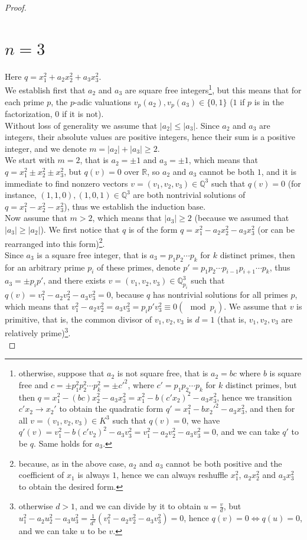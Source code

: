 \documentclass{article}
\begin{document}
\begin{proof}
\section*{$n=3$}
Here $q=x_1^2+a_2x_2^2+a_3x_3^2$.\\
We establish first that $a_2$ and $a_3$ are square free integers\footnote{otherwise, suppose that $a_2$ is not square free, that is $a_2=bc$ where $b$ is square free and $c=\pm{p}_1^2p_2^2\cdots{p}_k^2=\pm{c}'^2$, where $c'={p}_1p_2\cdots{p}_k$ for $k$ distinct primes, but then $q=x_1^2-(bc)x_2^2-a_3x_3^2=x_1^2-b(c'x_2)^2-a_3x_3^2$, hence we transition $c'x_2\rightarrow{x}_2'$ to obtain the quadratic form $q'=x_1^2-bx_2'^2-a_3x_3^2$, and then for all $v=(v_1,v_2,v_3)\in{K}^3$ such that $q(v)=0$, we have $q'(v)=v_1^2-b(c'v_2)^2-a_3v_3^2=v_1^2-a_2v_2^2-a_3v_3^2=0$, and we can take $q'$ to be $q$. Same holds for $a_3$.}, but this means that for each prime $p$, the $p$-adic valuations $v_p(a_2),v_p(a_3)\in\{0,1\}$ ($1$ if $p$ is in the factorization, $0$ if it is not).\\
Without loss of generality we assume that $|a_2|\leq|a_3|$. Since $a_2$ and $a_3$ are integers, their absolute values are positive integers, hence their sum is a positive integer, and we denote $m=|a_2|+|a_3|\geq2$.\\
We start with $m=2$, that is $a_2=\pm1$ and $a_3=\pm1$, which means that \\$q=x_1^2\pm{x}_2^2\pm{x}_3^2$, but $q(v)=0$ over $\mathbb{R}$, so $a_2$ and $a_3$ cannot be both $1$, and it is immediate to find nonzero vectors $v=(v_1,v_2,v_3)\in\mathbb{Q}^3$ such that $q(v)=0$ (for instance, $(1,1,0),(1,0,1)\in\mathbb{Q}^3$ are both nontrivial solutions of $q=x_1^2-x_2^2-x_3^2$), thus we establish the induction base.\\
\newline
Now assume that $m>2$, which means that $|a_3|\geq{2}$ (because we assumed that $|a_3|\geq|a_2|$). We first notice that $q$ is of the form $q=x_1^2-a_2x_2^2-a_3x_3^2$ (or can be rearranged into this form)\footnote{because, as in the above case, $a_2$ and $a_3$ cannot be both positive and the coefficient of $x_1$ is always $1$, hence we can always reshuffle $x_1^2$, $a_2x_2^2$ and $a_3x_3^2$ to obtain the desired form.}.\\ 
Since $a_3$ is a square free integer, that is $a_3=p_1p_2\cdots{p}_k$ for $k$ distinct primes, then for an arbitrary prime $p_i$ of these primes, denote $p'=p_1p_2\cdots{p}_{i-1}p_{i+1}\cdots{p}_k$, thus $a_3=\pm{p}_ip'$, and there exists $v=(v_1,v_2,v_3)\in\mathbb{Q}_{p_i}^3$ such that $q(v)=v_1^2-a_2v_2^2-a_3v_3^2=0$, because $q$ has nontrivial solutions for all primes $p$, which means that ${v}_1^2-a_2v_2^2=a_3v_3^2=p_ip'v_3^2\equiv0(\mod{p_i})$. We assume that $v$ is primitive, that is, the common divisor of $v_1,v_2,v_3$ is $d=1$ (that is, $v_1,v_2,v_3$ are relatively prime)\footnote{otherwise $d>1$, and we can divide by it to obtain $u=\frac{v}{d}$, but $u_1^2-a_2u_2^2-a_3u_3^2=\frac{1}{d^2}(v_1^2-a_2v_2^2-a_3v_3^2)=0$, hence $q(v)=0\iff{q}(u)=0$, and we can take $u$ to be $v$.}.\\

\end{proof}
\end{document}
